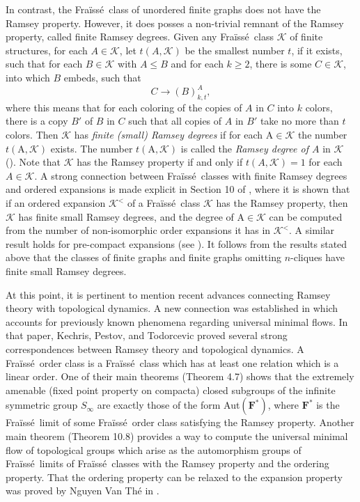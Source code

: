\documentclass{amsart}
\theoremstyle{remark}
\theoremstyle{definition}
\theoremstyle{remark}
\newcommand{\A}{\mathrm{A}}
\newcommand{\ra}{\rightarrow}
\newcommand{\Fraisse}{Fra{\"{i}}ss{\'{e}}}
\begin{document}
In contrast, the \Fraisse\ class of unordered finite graphs  does not have the Ramsey property.
However, it does posses a non-trivial remnant of the Ramsey property, called
  finite Ramsey degrees.
Given any \Fraisse\ class $\mathcal{K}$ of finite structures,
for each $A\in\mathcal{K}$, let
$t(A,\mathcal{K})$  be the smallest number $t$, if it exists, such that
for each $B\in \mathcal{K}$ with $A\le B$ and for each $k\ge 2$,
there is some $C\in\mathcal{K}$, into which $B$ embeds, such that
\begin{equation}
C\ra (B)^A_{k,t},
\end{equation}
where this means that for each coloring of the copies of $A$ in $C$ into $k$ colors,
there is a copy $B'$ of $B$ in $C$ such that all copies of $A$ in $B'$ take no more than $t$ colors.
Then $\mathcal{K}$ has  {\em finite (small) Ramsey degrees} if
for each $\A\in\mathcal{K}$ the number
 $t(\A,\mathcal{K})$  exists.
The number $t(\A,\mathcal{K})$ is called the {\em Ramsey degree of $A$} in $\mathcal{K}$ (\cite{Fouche98}).
Note that $\mathcal{K}$ has the Ramsey property if and only if $t(A,\mathcal{K})=1$ for each $A\in\mathcal{K}$.
A strong connection between \Fraisse\ classes with finite Ramsey degrees and ordered expansions is made explicit in Section 10 of \cite{Kechris/Pestov/Todorcevic05},
where it is shown that if an ordered expansion $\mathcal{K}^{<}$ of a \Fraisse\ class $\mathcal{K}$ has the Ramsey property,
then $\mathcal{K}$ has finite small Ramsey degrees, and the degree of $\A\in\mathcal{K}$  can be computed from the number of non-isomorphic order expansions it has in $\mathcal{K}^{<}$.
A similar result holds for pre-compact expansions (see \cite{NVTHabil}).
It follows from the results stated above  that the classes of finite graphs and finite graphs omitting $n$-cliques have finite small Ramsey degrees.


At this point, it is pertinent to  mention recent
advances connecting Ramsey theory with topological dynamics.
A new connection
was established in \cite{Kechris/Pestov/Todorcevic05} which accounts for previously known phenomena regarding universal minimal flows.
In that paper,
Kechris, Pestov, and Todorcevic  proved several strong correspondences between Ramsey theory and topological dynamics.
A \Fraisse\ order class is a \Fraisse\  class which
has at least one relation which is a linear order.
One of their main theorems  (Theorem 4.7)
shows that  the extremely amenable (fixed point property on compacta) closed subgroups of the infinite symmetric group $S_{\infty}$ are exactly those of the form Aut$(\mathbf{F}^*)$, where $\mathbf{F}^*$
is the \Fraisse\ limit of some \Fraisse\ order class satisfying the Ramsey property.
Another main theorem (Theorem 10.8)
provides a way to compute the universal minimal flow of
topological groups which arise as the automorphism groups of \Fraisse\ limits of \Fraisse\ classes with the Ramsey property and the ordering property.
That the ordering property can be relaxed to the expansion property was proved by Nguyen Van Th\'{e} in \cite{NVT13}.
\end{document}
